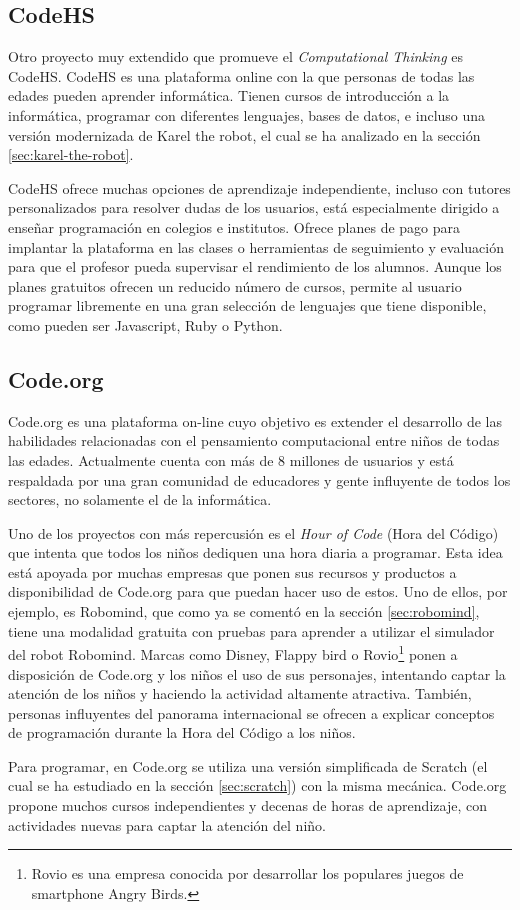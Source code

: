 \subsection{CodeHS}
\label{sec:CodeHS}


Otro proyecto muy extendido que promueve el \emph{Computational Thinking} es CodeHS. CodeHS es una plataforma online con la que personas de todas las edades pueden aprender informática. Tienen cursos de introducción a la informática, programar con diferentes lenguajes, bases de datos, e incluso una versión modernizada de Karel the robot, el cual se ha analizado en la sección \ref{sec:karel-the-robot}.

CodeHS ofrece muchas opciones de aprendizaje independiente, incluso con tutores personalizados para resolver dudas de los usuarios, está especialmente dirigido a enseñar programación en colegios e institutos. Ofrece planes de pago para implantar la plataforma en las clases o herramientas de seguimiento y evaluación para que el profesor pueda supervisar el rendimiento de los alumnos. Aunque los planes gratuitos ofrecen un reducido número de cursos, permite al usuario programar libremente en una gran selección de lenguajes que tiene disponible, como pueden ser Javascript, Ruby o Python.


\subsection{Code.org}
\label{sec:Code.org}

Code.org\cite{code-org} es una plataforma on-line cuyo objetivo es extender el desarrollo de las habilidades relacionadas con el pensamiento computacional entre niños de todas las edades. Actualmente cuenta con más de 8 millones de usuarios y está respaldada por una gran comunidad de educadores y gente influyente de todos los sectores, no solamente el de la informática.

Uno de los proyectos con más repercusión es el \emph{Hour of Code}\cite{hour-of-code} (Hora del Código) que intenta que todos los niños dediquen una hora diaria a programar. Esta idea está apoyada por muchas empresas que ponen sus recursos y productos a disponibilidad de Code.org para que puedan hacer uso de estos. Uno de ellos, por ejemplo, es Robomind, que como ya se comentó en la sección \ref{sec:robomind}, tiene una modalidad gratuita con pruebas para aprender a utilizar el simulador del robot Robomind. Marcas como Disney, Flappy bird o Rovio\footnote{Rovio es una empresa conocida por desarrollar los populares juegos de smartphone Angry Birds.} ponen a disposición de Code.org y los niños el uso de sus personajes, intentando captar la atención de los niños y haciendo la actividad altamente atractiva. También, personas influyentes del panorama internacional se ofrecen a explicar conceptos de programación durante la Hora del Código a los niños. 

Para programar, en Code.org se utiliza una versión simplificada de Scratch (el cual se ha estudiado en la sección \ref{sec:scratch}) con la misma mecánica. Code.org propone muchos cursos independientes y decenas de horas de aprendizaje, con actividades nuevas para captar la atención del niño. 


